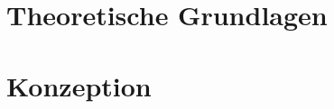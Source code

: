 


\newcommand{\thema}{HTWG Lab Cloud mit OpenStack}
\newcommand{\zusammenfassung}{Hier kommt eine kurze Zusammenfassung der Arbeit}

\newcommand{\ausgabedatum}{}
\newcommand{\abgabedatum}{}
\newcommand{\autor}{Dennis Parlak, Simon Kessler, Tobias Keh, Marco Grupe}
\newcommand{\autorStrasse}{}
\newcommand{\autorPLZ}{}
\newcommand{\autorOrt}{}
\newcommand{\autorGeburtsort}{}
\newcommand{\autorGeburtsdatum}{}
\newcommand{\prueferA}{Prof. Dr. Hanno Langweg}
\newcommand{\prueferB}{}
\newcommand{\firma}{}
\newcommand{\studiengang}{MSI Informatik}

\raggedbottom

\frontmatter


\setcounter{tocdepth}{1}
\tableofcontents 
\listoffigures
\listoftables
\printnomenclature

\mainmatter
    	
 	\part{Theoretische Grundlagen}

 		\part{Konzeption}
		
   	\cleardoublepage
   	\setcounter{page}{12}
	 
	
\begin{appendix}   
\end{appendix}
\backmatter


